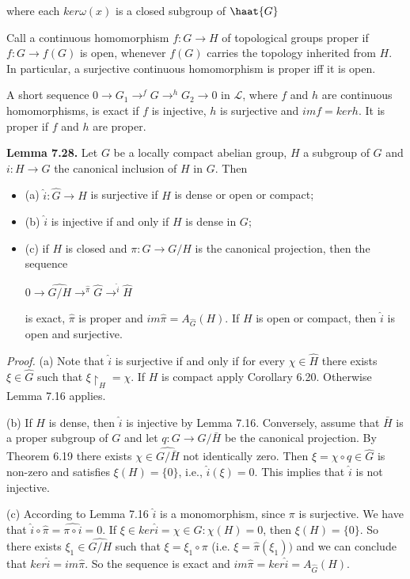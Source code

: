 \documentclass[12pt]{article}
\begin{document}
where each $ker \omega(x)$ is a closed subgroup of $\haat{G}$


Call a continuous homomorphism $f : G \to H$ of topological groups proper if $f : G \to f(G)$ is open, whenever
$f(G)$ carries the topology inherited from $H$. In particular, a surjective continuous homomorphism is proper iff
it is open.


    A short sequence $0 \to G_1 \to^f G \to^h G_2 \to 0$ in $\mathcal{L}$, where $f$ and $h$ are continuous homomorphisms, is exact if
$f$ is injective, $h$ is surjective and $im f = ker h$. It is proper if $f$ and $h$ are proper.


\textbf{Lemma 7.28.} Let $G$ be a locally compact abelian group, $H$ a subgroup of $G$ and $i : H \to G$ the canonical
inclusion of $H$ in $G$. Then


\begin{itemize}

    \item (a) $\hat{i} : \hat{G} \to \hat{H}$ is surjective if $H$ is dense or open or compact;

    \item (b) $\hat{i}$ is injective if and only if $H$ is dense in $G$;

    \item (c) if $H$ is closed and $\pi : G \to G/H$ is the canonical projection, then the sequence
    
            $0 \to \hat{G/H} \to^{\hat{\pi}} \hat{G} \to^{\hat{i}} \hat{H}$

        is exact, $\hat{\pi}$ is proper and $im \hat{\pi} = A_{\hat{G}}(H)$. If $H$ is open or compact, then $\hat{i}$ is open and surjective.
\end{itemize}


\emph{Proof.} (a) Note that $\hat{i}$ is surjective if and only if for every $\chi \in \hat{H}$ there exists $\xi \in \hat{G}$ such that $\xi \upharpoonright_H = \chi$. If $H$ is
compact apply Corollary 6.20. Otherwise Lemma 7.16 applies.


    (b) If $H$ is dense, then $\hat{i}$ is injective by Lemma 7.16. Conversely, assume that $\bar{H}$ is a proper subgroup of $G$
and let $q : G \to G/\bar{H}$ be the canonical projection. By Theorem 6.19 there exists $\chi \in \hat{G/\bar{H}}$ not identically zero.
Then $\xi = \chi \circ q \in \hat{G}$ is non-zero and satisfies $\xi(H) = \{0\}$, i.e., $\hat{i}(\xi) = 0$. This implies that $\hat{i}$ is not injective.


    (c) According to Lemma 7.16 $\hat{i}$ is a monomorphism, since $\pi$ is surjective. We have that $\hat{i} \circ \hat{\pi} = \hat{\pi \circ i} = 0$.
If $\xi \in ker \hat{i} = {\chi \in \hat{G} : \chi(H) = {0}}$, then $\xi(H) = \{0\}$. So there exists $\xi_1 \in \hat{G/H}$ such that $\xi = \xi_1 \circ \pi$ (i.e.
$\xi = \hat{\pi}(\xi_1))$ and we can conclude that $ker \hat{i} = im \hat{\pi}$. So the sequence is exact and $im \hat{\pi} = ker \hat{i} = A_{\hat{G}}(H)$.
\end{document}
